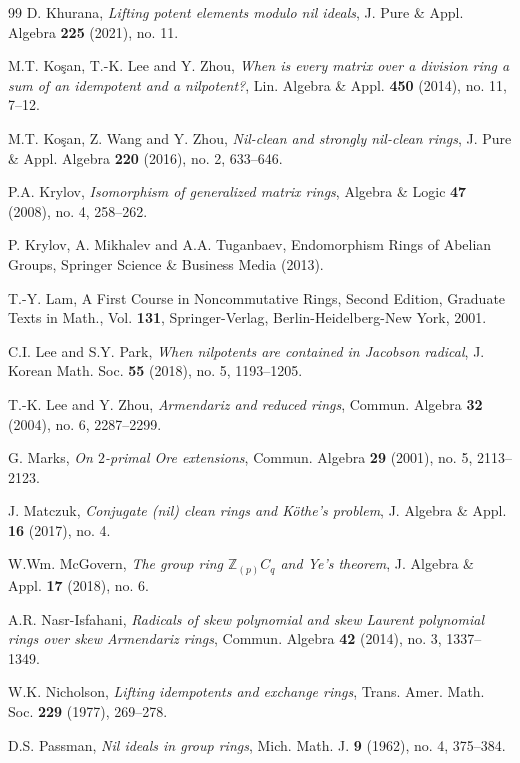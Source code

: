 \documentclass[12pt]{amsart}
\theoremstyle{definition}
\theoremstyle{remark}
\numberwithin{equation}{section}
\begin{document}
\begin{thebibliography}{99}
D. Khurana, {\it Lifting potent elements modulo nil ideals}, J. Pure \& Appl. Algebra \textbf{225} (2021), no. 11.

M.T. Ko\c{s}an, T.-K. Lee and Y. Zhou, {\it When is every matrix over a division ring a sum of an idempotent and a nilpotent?}, Lin. Algebra \& Appl. {\bf 450} (2014), no. 11, 7--12.

M.T. Ko\c{s}an, Z. Wang and Y. Zhou, {\it Nil-clean and strongly nil-clean rings}, J. Pure \& Appl. Algebra \textbf{220} (2016), no. 2, 633--646.

P.A. Krylov, {\it Isomorphism of generalized matrix rings}, Algebra \& Logic \textbf{47} (2008), no. 4, 258--262.

P. Krylov, A. Mikhalev and A.A. Tuganbaev, Endomorphism Rings of Abelian Groups, Springer Science \& Business Media (2013).

T.-Y. Lam, A First Course in Noncommutative Rings, Second Edition, Graduate Texts in Math., Vol. \textbf{131}, Springer-Verlag, Berlin-Heidelberg-New York, 2001.

C.I. Lee and S.Y. Park, {\it When nilpotents are contained in Jacobson radical}, J. Korean Math. Soc. \textbf{55} (2018), no. 5, 1193--1205.

T.-K. Lee and Y. Zhou, {\it Armendariz and reduced rings}, Commun. Algebra \textbf{32} (2004), no. 6, 2287--2299.

G. Marks, {\it On $2$-primal Ore extensions}, Commun. Algebra \textbf{29} (2001), no. 5, 2113--2123.

J. Matczuk, {\it Conjugate (nil) clean rings and K\"othe's problem}, J. Algebra \& Appl. \textbf{16} (2017), no. 4.

W.Wm. McGovern, {\it The group ring $\mathbb{Z}_{(p)}C_q$ and Ye's theorem}, J. Algebra \& Appl. {\bf 17} (2018), no. 6.

A.R. Nasr-Isfahani, {\it Radicals of skew polynomial and skew Laurent polynomial rings over skew Armendariz rings},
Commun. Algebra \textbf{42} (2014), no. 3, 1337--1349.

W.K. Nicholson, {\it Lifting idempotents and exchange rings}, Trans. Amer. Math. Soc. \textbf{229} (1977), 269--278.

D.S. Passman, {\it Nil ideals in group rings}, Mich. Math. J. \textbf{9} (1962), no. 4, 375--384.


\end{thebibliography}
\end{document}
